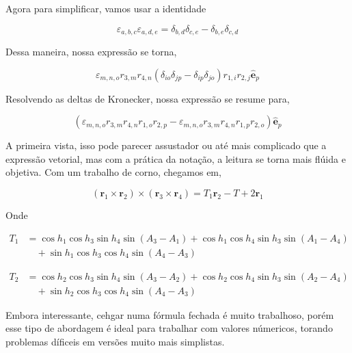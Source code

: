 \documentclass[11pt]{article}
\begin{document}
\begin{pproblem}
\begin{pssolution*}{}{}
    Agora para simplificar, vamos usar a identidade 

    \[\varepsilon_{a,b,c}\varepsilon_{a,d,e} = \delta_{b,d}\delta_{c,e}-\delta_{b,e}\delta_{c,d}\]

    Dessa maneira, nossa expressão se torna, 

    \[\varepsilon_{m,n,o}r_{3,m}r_{4,n}(\delta_{io}\delta_{jp}-\delta_{ip}\delta_{jo})r_{1,i}r_{2,j}\mathbf{\hat e}_p\]
    
    Resolvendo as deltas de Kronecker, nossa expressão se resume para, 

    \[(\varepsilon_{m,n,o}r_{3,m}r_{4,n}r_{1,o}r_{2,p}-\varepsilon_{m,n,o}r_{3,m}r_{4,n}r_{1,p}r_{2,o})\mathbf{\hat e}_p\]

    A primeira vista, isso pode parecer assustador ou até mais complicado que a expressão vetorial, mas com a prática da notação, a leitura se torna mais flúida e objetiva. Com um trabalho de corno, chegamos em, 

    \[\boxed{(\mathbf r_1 \times \mathbf r_2)\times(\mathbf r_3 \times \mathbf r_4) = T_1\mathbf r_2 - T+2\mathbf r_1}\]

    Onde

    \[
    \begin{aligned}
    T_1 &= 
    \cos h_1 \cos h_3 \sin h_4 \sin(A_3 - A_1)
    + \cos h_1 \cos h_4 \sin h_3 \sin(A_1 - A_4) \\
    &\quad + \sin h_1 \cos h_3 \cos h_4 \sin(A_4 - A_3)
    \end{aligned}
    \]

    \[
    \begin{aligned}
    T_2 &=
    \cos h_2 \cos h_3 \sin h_4 \sin(A_3 - A_2)
    + \cos h_2 \cos h_4 \sin h_3 \sin(A_2 - A_4) \\
    &\quad + \sin h_2 \cos h_3 \cos h_4 \sin(A_4 - A_3)
    \end{aligned}
    \]

    Embora interessante, cehgar numa fórmula fechada é muito trabalhoso, porém esse tipo de abordagem é ideal para trabalhar com valores númericos, torando problemas díficeis em versões muito mais simplistas.
\end{pssolution*}
\end{pproblem}
\end{document}
